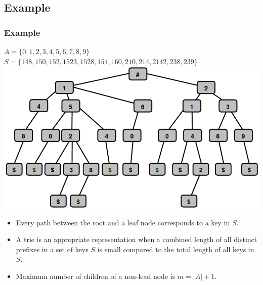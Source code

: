 \documentclass{beamer}
\begin{document}
\subsection{Example}
\begin{frame}
\frametitle{Example}
$A = \{
0
,
1
,
2
,
3
,
4
,
5
,
6
,
7
,
8
,
9
\}$\\
$S = \{
148
,
150
,
152
,
1523
,
1528
,
154
,
160
,
210
,
214
,
2142
,
238
,
239
\}$
\includegraphics[scale=0.25]{example.png}
\begin{itemize}
\item Every path between the root and a leaf node corresponds to a key in $S$.
\item A trie is an appropriate representation when a combined length of all distinct prefixes in a set of keys $S$ is small compared to the total length of all keys in $S$.
\item Maximum number of children of a non-lead node is $m = |A| + 1$.
\end{itemize}
\end{frame}
\end{document}
